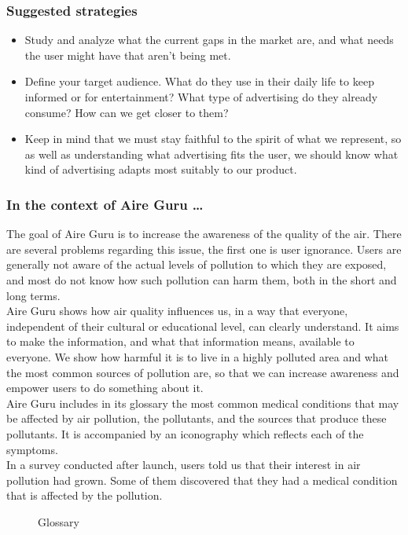 \subsubsection*{Suggested strategies}

\begin{itemize}
    \item Study and analyze what the current gaps in the market are, and what needs the user might have that aren't being met.
    \item Define your target audience. What do they use in their daily life to keep informed or for entertainment?
    What type of advertising do they already consume? How can we get closer to them?
    \item Keep in mind that we must stay faithful to the spirit of what we represent, so as well as understanding what advertising fits the user,
    we should know what kind of advertising adapts most suitably to our product.
\end{itemize}

\subsubsection*{In the context of Aire Guru \ldots}

The goal of Aire Guru is to increase the awareness of the quality of the air.
There are several problems regarding this issue, the first one is user ignorance.
Users are generally not aware of the actual levels of pollution to which they are exposed, and most do not know how such pollution can harm them,
both in the short and long terms.\\

Aire Guru shows how air quality influences us, in a way that everyone, independent of their cultural or educational level, can clearly understand.
It aims to make the information, and what that information means, available to everyone.
We show how harmful it is to live in a highly polluted area and what the most common sources of pollution
are, so that we can increase awareness and empower users to do something about it.\\

Aire Guru includes in its glossary the most common medical conditions that may be affected by air pollution, the pollutants, and the sources that produce these pollutants.
It is accompanied by an iconography which reflects each of the symptoms. \\

In a survey conducted after launch, users told us that their interest in air pollution had grown.
Some of them discovered that they had a medical condition that is affected by the pollution.\\

\begin{figure}[ht]
    \centering
    \hfill
    \caption{Glossary}
\end{figure}